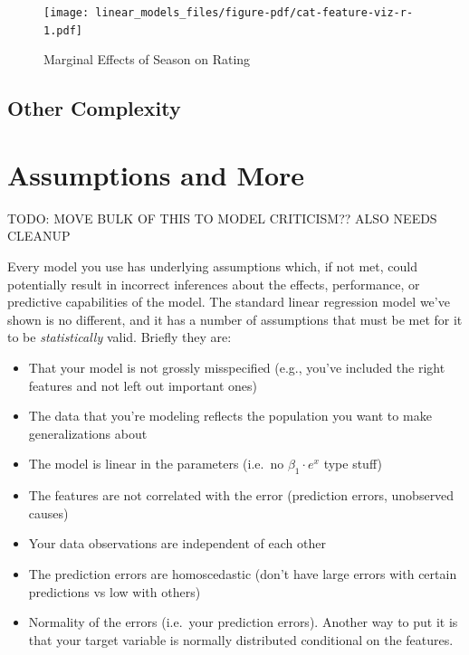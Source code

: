 \documentclass[
  letterpaper,
]{krantz}
\providecommand{\tightlist}{%
  \setlength{\itemsep}{0pt}\setlength{\parskip}{0pt}}\usepackage{longtable,booktabs,array}
\begin{document}
\begin{figure}[H]

{\centering \texttt{[image: linear\_models\_files/figure-pdf/cat-feature-viz-r-1.pdf]}

}

\caption{Marginal Effects of Season on Rating}

\end{figure}%

\subsection{Other Complexity}\label{sec-lm-other-complexity}

\section{Assumptions and More}\label{sec-lm-assumptions}

TODO: MOVE BULK OF THIS TO MODEL CRITICISM?? ALSO NEEDS CLEANUP

Every model you use has underlying assumptions which, if not met, could
potentially result in incorrect inferences about the effects,
performance, or predictive capabilities of the model. The standard
linear regression model we've shown is no different, and it has a number
of assumptions that must be met for it to be \emph{statistically} valid.
Briefly they are:

\begin{itemize}
\tightlist
\item
  That your model is not grossly misspecified (e.g., you've included the
  right features and not left out important ones)
\item
  The data that you're modeling reflects the population you want to make
  generalizations about
\item
  The model is linear in the parameters (i.e.~no \(\beta_1\cdot e^x\)
  type stuff)
\item
  The features are not correlated with the error (prediction errors,
  unobserved causes)
\item
  Your data observations are independent of each other
\item
  The prediction errors are homoscedastic (don't have large errors with
  certain predictions vs low with others)
\item
  Normality of the errors (i.e.~your prediction errors). Another way to
  put it is that your target variable is normally distributed
  conditional on the features.
\end{itemize}
\end{document}
